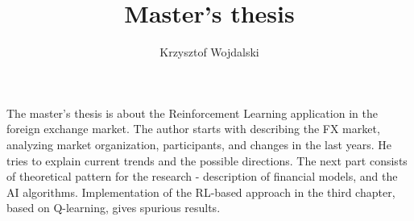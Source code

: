 \title{Master's thesis}
\author{Krzysztof Wojdalski}
\maketitle






The master's thesis is about the Reinforcement Learning application in the foreign exchange market. 
The author starts with describing the FX market, analyzing market organization, participants, and changes in the last
years. He tries to explain current trends and the possible directions. 
The next part consists of theoretical pattern for the research - description of financial models, 
and the AI algorithms. 
Implementation of the RL-based approach in the third chapter, based on Q-learning, gives spurious results. 



















